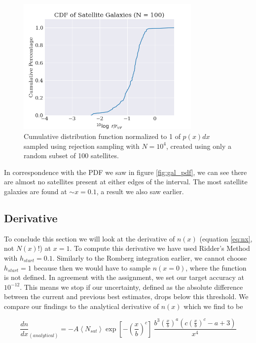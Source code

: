 \begin{figure}
    \centering
    \includegraphics[width=0.8\textwidth]{results/satellite_galaxies_cdf.png}
    \caption{Cumulative distribution function normalized to 1 of $p(x)dx$ sampled using rejection sampling with $N=10^4$, created using only a random subset of 100 satellites.}
    \label{fig:gal_cdf}
\end{figure}

In correspondence with the PDF we saw in figure \ref{fig:gal_pdf}, we can see there are almost no satellites present at either edges of the interval. The most satellite galaxies are found at $\sim x = 0.1$, a result we also saw earlier.


\subsection{Derivative}

To conclude this section we will look at the derivative of $n(x)$ (equation \ref{eq:nx}, not $N(x)$!) at $x=1$. To compute this derivative we have used Ridder's Method with $h_{start} = 0.1$. Similarly to the Romberg integration earlier, we cannot choose $h_{start} = 1$ because then we would have to sample $n(x=0)$, where the function is not defined. In agreement with the assignment, we set our target accuracy at $10^{-12}$. This means we stop if our uncertainty, defined as the absolute difference between the current and previous best estimates, drops below this threshold. We compare our findings to the analytical derivative of $n(x)$ which we find to be

\begin{equation}
    \frac{dn}{dx}_{(analytical)} = -A\left<N_{sat}\right>\exp\left[-\left(\frac{x}{b}\right)^c\right]~\frac{b^3\left(\frac{x}{b}\right)^a\left(c\left(\frac{x}{b}\right)^c - a + 3 \right) }{x^4}
\end{equation}

